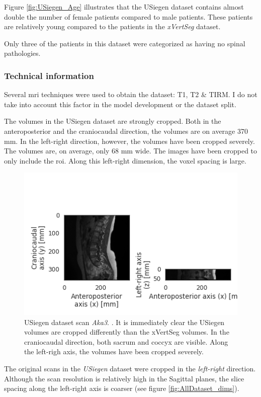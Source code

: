 Figure \ref{fig:USiegen_Age} illustrates that the USiegen dataset contains almost double the number of female patients compared to male patients.
These patients are relatively young compared to the patients in the \textit{xVertSeg} dataset.

Only three of the patients in this dataset were categorized as having no spinal pathologies.

\subsubsection{Technical information}

Several \acrlong{mri} techniques were used to obtain the dataset: T1, T2 \& TIRM.
I do not take into account this factor in the model development or the dataset split.

The volumes in the USiegen dataset are strongly cropped. 
Both in the anteroposterior and the craniocaudal direction, the volumes are on average 370 mm.
In the left-right direction, however, the volumes have been cropped severely. The volumes are, on average, only 68 mm wide.
The images have been cropped to only include the \acrshort{roi}.
Along this left-right dimension, the voxel spacing is large. 

\begin{figure}
    \centering
    \includegraphics[width=.95\textwidth]{automated_graphs/USiegen_Aka3.png}
    \caption{USiegen dataset scan \textit{Aka3}. \label{fig:USiegen_Aka3}. It is immediately clear the USiegen volumes are cropped differently than the xVertSeg volumes.
    In the craniocaudal direction, both sacrum and coccyx are visible. Along the left-righ axis, the volumes have been cropped severely.}
\end{figure}

The original scans in the \textit{USiegen} dataset were cropped in the \textit{left-right} direction. 
Although the scan resolution is relatively high in the Sagittal planes, the slice spacing along the left-right axis is coarser (see figure \ref{fig:AllDataset_dims}).  